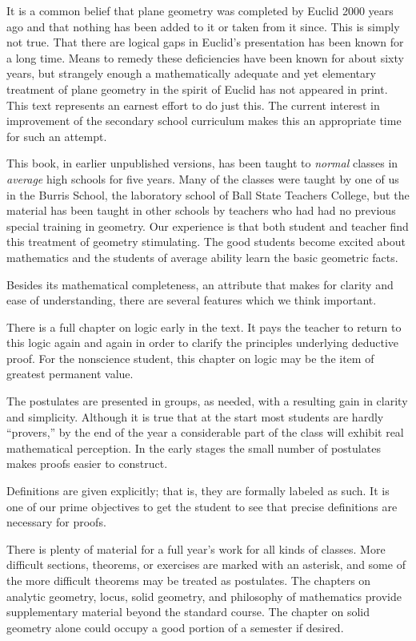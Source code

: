 \documentclass[11pt]{book}
\theoremstyle{bkplain}
\theoremstyle{XIplainnote}
\theoremstyle{bkplain}
\theoremstyle{bkplain}
\begin{document}
It is a common belief that plane geometry was completed by Euclid 2000 years ago
and that nothing has been added to it or taken from it since. This is simply not
true. That there are logical gaps in Euclid's presentation has been known for a
long time. Means to remedy these deficiencies have been known for about sixty
years, but strangely enough a mathematically adequate and yet elementary
treatment of plane geometry in the spirit of Euclid has not appeared in print.
This text represents an earnest effort to do just this. The current interest in
improvement of the secondary school curriculum makes this an appropriate time
for such an attempt.

This book, in earlier unpublished versions, has been taught to \emph{normal}
classes in \emph{average} high schools for five years. Many of the classes were
taught by one of us in the Burris School, the laboratory school of Ball State
Teachers College, but the material has been taught in other schools by teachers
who had had no previous special training in geometry. Our experience is that
both student and teacher find this treatment of geometry stimulating. The good
students become excited about mathematics and the students of average ability
learn the basic geometric facts.

Besides its mathematical completeness, an attribute that makes for clarity and
ease of understanding, there are several features which we think important.

There is a full chapter on logic early in the text. It pays the teacher to
return to this logic again and again in order to clarify the principles
underlying deductive proof. For the nonscience student, this chapter on logic
may be the item of greatest permanent value.

The postulates are presented in groups, as needed, with a resulting gain in
clarity and simplicity. Although it is true that at the start most students are
hardly ``provers,'' by the end of the year a considerable part of the class will
exhibit real mathematical perception. In the early stages the small number of
postulates makes proofs easier to construct.

Definitions are given explicitly; that is, they are formally labeled as such. It
is one of our prime objectives to get the student to see that precise
definitions are necessary for proofs.

There is plenty of material for a full year's work for all kinds of classes.
More difficult sections, theorems, or exercises are marked with an asterisk, and
some of the more difficult theorems may be treated as postulates. The chapters
on analytic geometry, locus, solid geometry, and philosophy of mathematics
provide supplementary material beyond the standard course. The chapter on solid
geometry alone could occupy a good portion of a semester if desired.
\end{document}
